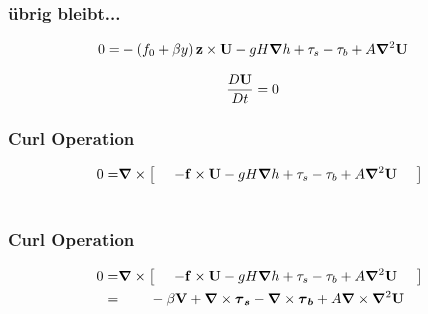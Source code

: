 \begin{frame}
\frametitle{übrig bleibt...}
\begin{align}
	0
	=
	&  -\left( f_{0} + \beta y \right) \mathbf{\bm{z}} \times \mathbf{\bm{U}} -    gH\mathbf{\bm{\nabla}}{h}  + \mathbf{\tau}_{s} - \mathbf{\tau}_{b}+ A\mathbf{\bm{\nabla}}^{2} \mathbf{\bm{U}}  \nonumber 
\end{align}

\begin{align}
	\frac{D\mathbf{\bm{U}}}{Dt}
	&=
	0\nonumber 
\end{align}
\end{frame}

\begin{frame}
\frametitle{Curl Operation}
\begin{align}
	0
	=&  \mathbf{\bm{\nabla}} \times \left[\;\;\;\;\;   -\mathbf{\bm{f}} \times \mathbf{\bm{U}}   -    g H \mathbf{\bm{\nabla}}{h} + \mathbf{\tau}_{s} - \mathbf{\tau}_{b} + A  \mathbf{\bm{\nabla}}^{2} \mathbf{\bm{U}} \;\;\;\;\;   \right]  \nonumber \\
     &     \nonumber 
\end{align}
\end{frame}


\begin{frame}
\frametitle{Curl Operation}
\begin{align}
	0
	=&  \mathbf{\bm{\nabla}} \times \left[ \;\;\;\;\;   -\mathbf{\bm{f}} \times \mathbf{\bm{U}}   -    g H \mathbf{\bm{\nabla}}{h} + \mathbf{\tau}_{s} - \mathbf{\tau}_{b} + A  \mathbf{\bm{\nabla}}^{2} \mathbf{\bm{U}}  \;\;\;\;\;   \right]  \nonumber \\
	=& \;\;\;\;\; \;\;\; -\beta \mathbf{\bm{V}}  + \mathbf{\bm{\nabla}} \times \mathbf{\bm{\mathbf{\tau}_{s}}} - \mathbf{\bm{\nabla}} \times \mathbf{\bm{\mathbf{\tau}_{b}}} + A  \mathbf{\bm{\nabla}} \times \mathbf{\bm{\nabla}}^{2} \mathbf{\bm{U}}    \nonumber 
\end{align}
\end{frame}
